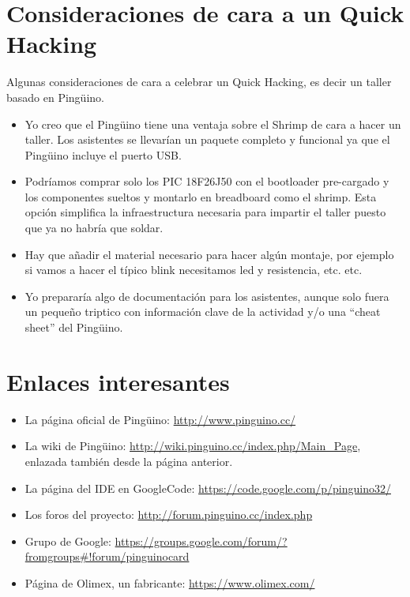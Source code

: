 \documentclass[12pt,a4paper,twoside,DIV=15]{scrartcl}
\begin{document}
\section{Consideraciones de cara a un Quick Hacking}
\label{sec:qh_opciones}


Algunas consideraciones de cara a celebrar un Quick Hacking, es decir un taller basado en Pingüino.
\begin{itemize}
\item Yo creo que el Pingüino tiene una ventaja sobre el Shrimp de cara a hacer un taller. Los asistentes se llevarían un paquete completo y funcional ya que el Pingüino incluye el puerto USB.
\item Podríamos comprar solo los PIC 18F26J50 con el bootloader pre-cargado y los componentes sueltos y montarlo en breadboard como el shrimp.
Esta opción simplifica la infraestructura necesaria para impartir el taller puesto que ya no habría que soldar.
\item Hay que añadir el material necesario para hacer algún montaje, por ejemplo si vamos a hacer el típico blink necesitamos led y resistencia, etc. etc.
\item Yo prepararía algo de documentación para los asistentes, aunque solo fuera un pequeño triptico con información clave de la actividad y/o una ``cheat sheet'' del Pingüino.
\end{itemize}


\section{Enlaces interesantes}
\label{sec:enlaces}

\begin{itemize}
\item La página oficial de Pingüino: \url{http://www.pinguino.cc/}
\item La wiki de Pingüino:
  \url{http://wiki.pinguino.cc/index.php/Main_Page}, enlazada también
  desde la página anterior.
\item La página del IDE en GoogleCode: \url{https://code.google.com/p/pinguino32/}
\item Los foros del proyecto: \url{http://forum.pinguino.cc/index.php}
\item Grupo de Google:
  \url{https://groups.google.com/forum/?fromgroups#!forum/pinguinocard}
\item Página de Olimex, un fabricante: \url{https://www.olimex.com/}
\end{itemize}
\end{document}
